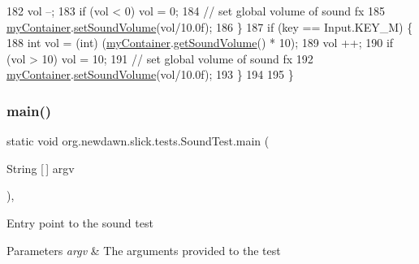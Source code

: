 \begin{DoxyCode}
182             vol --;
183             \textcolor{keywordflow}{if} (vol < 0) vol = 0;
184             \textcolor{comment}{// set global volume of sound fx}
185             \mbox{\hyperlink{classorg_1_1newdawn_1_1slick_1_1tests_1_1_sound_test_a468a454f66fe1fd34c65142e04714822}{myContainer}}.\mbox{\hyperlink{classorg_1_1newdawn_1_1slick_1_1_game_container_aa023e8d1edafe3d1a57a04d32e85dc9f}{setSoundVolume}}(vol/10.0f);
186         \}
187         \textcolor{keywordflow}{if} (key == Input.KEY\_M) \{
188             \textcolor{keywordtype}{int} vol = (int) (\mbox{\hyperlink{classorg_1_1newdawn_1_1slick_1_1tests_1_1_sound_test_a468a454f66fe1fd34c65142e04714822}{myContainer}}.\mbox{\hyperlink{classorg_1_1newdawn_1_1slick_1_1_game_container_a7c82c1b3a36e8c8fd3b2167042c2c63d}{getSoundVolume}}() * 10);
189             vol ++;
190             \textcolor{keywordflow}{if} (vol > 10) vol = 10;
191             \textcolor{comment}{// set global volume of sound fx}
192             \mbox{\hyperlink{classorg_1_1newdawn_1_1slick_1_1tests_1_1_sound_test_a468a454f66fe1fd34c65142e04714822}{myContainer}}.\mbox{\hyperlink{classorg_1_1newdawn_1_1slick_1_1_game_container_aa023e8d1edafe3d1a57a04d32e85dc9f}{setSoundVolume}}(vol/10.0f);
193         \}
194 
195     \}
\end{DoxyCode}
\mbox{\label{classorg_1_1newdawn_1_1slick_1_1tests_1_1_sound_test_a9bdeb4f80c07bd010efd98dad6018306}} 
\subsubsection{\texorpdfstring{main()}{main()}}
{\footnotesize\ttfamily static void org.\+newdawn.\+slick.\+tests.\+Sound\+Test.\+main (\begin{DoxyParamCaption}\item[{String \mbox{[}$\,$\mbox{]}}]{argv }\end{DoxyParamCaption})\hspace{0.3cm}{\ttfamily [inline]}, {\ttfamily [static]}}

Entry point to the sound test


\begin{DoxyParams}{Parameters}
{\em argv} & The arguments provided to the test \\
\hline
\end{DoxyParams}

